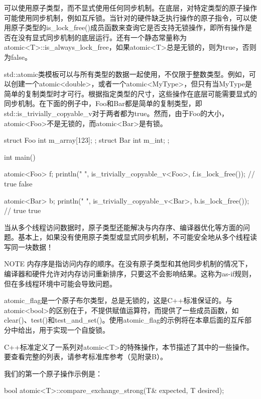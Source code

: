 可以使用原子类型，而不显式使用任何同步机制。在底层，对特定类型的原子操作可能使用同步机制，例如互斥锁。当针对的硬件缺乏执行操作的原子指令，可以使用原子类型的is\_lock\_free()成员函数来查询它是否支持无锁操作，即所有操作是否在没有显式同步机制的底层运行。还有一个静态常量称为atomic<T>::is\_always\_lock\_free，如果atomic<T>总是无锁的，则为true，否则为false。

std::atomic类模板可以与所有类型的数据一起使用，不仅限于整数类型。例如，可以创建一个atomic<double>，或者一个atomic<MyType>，但只有当MyType是简单的复制类型时才可行。根据指定类型的尺寸，这些操作在底层可能需要显式的同步机制。在下面的例子中，Foo和Bar都是简单的复制类型，即std::is\_trivially\_copyable\_v对于两者都为true。然而，由于Foo的大小，atomic<Foo>不是无锁的，而atomic<Bar>是有锁。

\begin{cpp}
struct Foo { int m_array[123]; };
struct Bar { int m_int; };

int main()
{
    atomic<Foo> f;
    println("{} {}", is_trivially_copyable_v<Foo>, f.is_lock_free()); // true false

    atomic<Bar> b;
    println("{} {}", is_trivially_copyable_v<Bar>, b.is_lock_free()); // true true
}
\end{cpp}

当从多个线程访问数据时，原子类型还能解决与内存序、编译器优化等方面的问题。基本上，如果没有使用原子类型或显式同步机制，不可能安全地从多个线程读写同一块数据！

\begin{myNotic}{NOTE}
内存序是指访问内存的顺序。在没有原子类型和其他同步机制的情况下，编译器和硬件允许对内存访问重新排序，只要这不会影响结果。这称为as-if规则，但在多线程环境中可能会导致问题。
\end{myNotic}

atomic\_flag是一个原子布尔类型，总是无锁的，这是C++标准保证的。与atomic<bool>的区别在于，不提供赋值运算符，而提供了一些成员函数，如clear()、test()和test\_and\_set()。使用atomic\_flag的示例将在本章后面的互斥部分中给出，用于实现一个自旋锁。


C++标准定义了一系列对atomic<T>的特殊操作，本节描述了其中的一些操作。要查看完整的列表，请参考标准库参考（见附录B）。

我们的第一个原子操作示例是：

\begin{cpp}
bool atomic<T>::compare_exchange_strong(T& expected, T desired);
\end{cpp}

